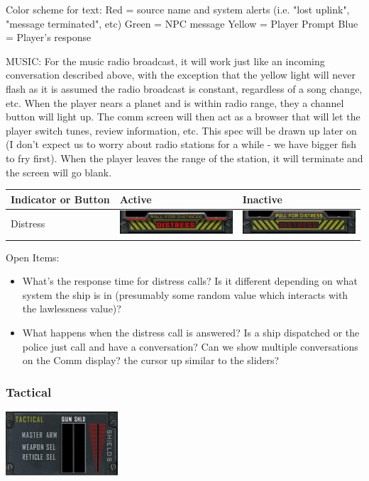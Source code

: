 Color scheme for text:
Red = source name and system alerts (i.e. "lost uplink", "message terminated", etc)
Green = NPC message
Yellow = Player Prompt
Blue = Player's response


MUSIC: 
For the music radio broadcast, it will work just like an incoming conversation described above, with the exception that the yellow light will never flash as it is assumed the radio broadcast is constant, regardless of a song change, etc. When the player nears a planet and is within radio range, they a channel button will light up. The comm screen will then act as a browser that will let the player switch tunes, review information, etc. This spec will be drawn up later on  (I don't expect us to worry about radio stations for a while - we have bigger fish to fry first). When the player leaves the range of the station, it will terminate and the screen will go blank.


\begin{tabular}{ | l | l | l | }
\hline
Indicator or Button & Active & Inactive \\
\hline
Distress & \includegraphics[scale=0.5]{images/distress_on.png} & \includegraphics[scale=0.5]{images/distress_off.png} \\
\hline
\end{tabular}

Open Items:
\begin{itemize}
\item What's the response time for distress calls?  Is it different
depending on what system the ship is in (presumably some random value
which interacts with the lawlessness value)?
\item What happens when the distress call is answered?  Is a ship dispatched or
the police just call and have a conversation?  Can we show multiple
conversations on the Comm display?
the cursor up similar to the sliders?
\end{itemize}

\subsubsection{Tactical}
\includegraphics[scale=0.7]{images/tactical.png}


